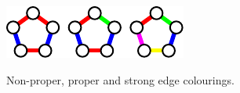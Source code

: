 \documentclass{uvamath}
\begin{document}
\begin{figure}[!ht]
    \centering
    \includegraphics[scale=1.25]{proper-strong-example}\par
    Non-proper, proper and strong edge colourings.
\end{figure}

\restoregeometry

\appendix





\printbibliography{}
\end{document}
